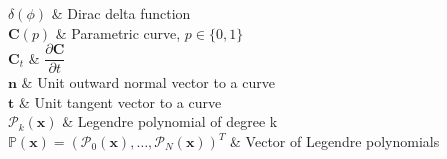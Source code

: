 \documentclass[12pt, oneside]{Thesis} %
\begin{document}
{$\delta(\phi)$ & Dirac delta function\\

$\textbf{C}(p)$ & Parametric curve, $p\in \{0,1 \}$ \\

$\textbf{C}_t$ & $\dfrac{\partial \textbf{C} }{\partial t}$ \\

$\textbf{n}$ & Unit outward normal vector to a curve \\

$\textbf{t}$ & Unit tangent vector to a curve \\

$\mathcal{P}_k(\textbf{x})$ & Legendre polynomial of degree k \\

$\mathbb{P}(\textbf{x})= \left(\mathcal{P}_0(\textbf{x}),\ldots, \mathcal{P}_{N}(\textbf{x})\right)^T $ & Vector of Legendre polynomials \\

}



\pagestyle{empty} %



\mainmatter %

\pagestyle{fancy} %
\setlength{\parindent}{2em}
%
%
% 
%
%
% 
% 
% 
% 



 


 
 
\end{document}
